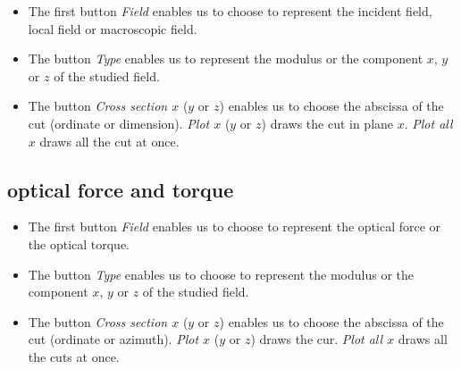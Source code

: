 \begin{itemize}

\item The first button {\it Field} enables us to choose to represent
  the incident field, local field or macroscopic field.

\item The button {\it Type} enables us to represent the modulus or the 
component $x$, $y$ or $z$ of the studied field.

\item The button {\it Cross section $x$} ($y$ or $z$) enables us to
  choose the abscissa of the cut (ordinate or dimension). {\it Plot
    $x$} ($y$ or $z$) draws the cut in plane $x$. {\it Plot all $x$}
  draws all the cut at once.

\end{itemize}

\subsection{optical force and torque}

\begin{itemize}

\item The first button {\it Field} enables us to choose to represent
  the optical force or the optical torque.

\item The button {\it Type} enables us to choose to represent the
  modulus or the component $x$, $y$ or $z$ of the studied field.

\item The button {\it Cross section $x$} ($y$ or $z$) enables us to
  choose the abscissa of the cut (ordinate or azimuth). {\it Plot $x$}
  ($y$ or $z$) draws the cur. {\it Plot all $x$} draws all the cuts at
  once.

\end{itemize}
